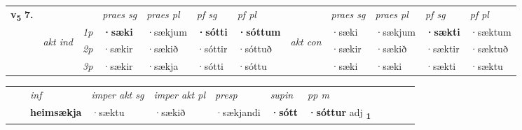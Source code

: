 \begin{tabular}{llllllllllll} \toprule
\multirow{4}{*}{{{\textbf{v{\textsubscript{5}}} \Large{\textbf{7.}}}}}  & &   &  \textit{praes sg}  & \textit{praes pl}  &\textit{ pf sg} & \textit{pf pl} &  &  \textit{praes sg}  & \textit{praes pl}  & \textit{pf sg} & \textit{pf pl } \\*
	\cmidrule{4-7} \cmidrule{9-12}
 & \multirow{3}{*}{\begin{turn}{90}\textit{akt ind}\end{turn}} & {\textit{1p}} & \textbf{·sæki} & ·sækjum    & \textbf{·sótti} & \textbf{·sóttum} & \multirow{3}{*}{\begin{turn}{90}\textit{akt con}\end{turn}} &·sæki & ·sækjum & \textbf{·sækti} & ·sæktum\\*
& &  {\textit{2p}} &  ·sækir  & ·sækið   & ·sóttir & ·sóttuð & & ·sækir & ·sækið & ·sæktir & ·sæktuð \\*
& &  {\textit{3p}} & ·sækir & ·sækja   & ·sótti & ·sóttu & & ·sæki & ·sæki& ·sækti & ·sæktu  \\*
\cmidrule{4-7} \cmidrule{9-12}
\end{tabular}


\begin{tabular}{llllllllllll}
 & & \textit{inf} & \textit{imper akt sg} & \textit{imper akt pl}   & \textit{presp} & \textit{supin}  & \textit{pp m}     \\*
  & & \textbf{heimsækja} & ·sæktu  & ·sækið   & ·sækjandi &  \textbf{·sótt}  & \textbf{·sóttur} adj \textbf{\textsubscript{1}} \\*
\cmidrule{1-12}
\end{tabular}



